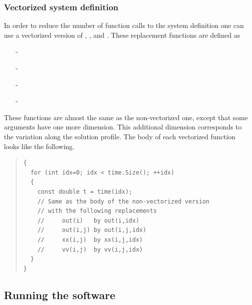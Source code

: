 \documentclass[10pt,a4paper]{ddedoc}
\begin{document}
\subsubsection{Vectorized system definition}\label{vecsysdef}

In order to reduce the number of function calls to the system definition one can 
use a vectorized version of , ,  and . These replacement functions are defined as
\begin{itemize}
  \item[-] 
  \item[-] 
  \item[-] 
  \item[-] 
\end{itemize}
These functions are almost the same as the non-vectorized one, except that some arguments have one more dimension. This additional dimension corresponds to the variation along the solution profile. The body of each vectorized function looks like the following.
{ \small \begin{quote} \begin{lstlisting}[frame=single]
{
  for (int idx=0; idx < time.Size(); ++idx)
  {
    const double t = time(idx);
    // Same as the body of the non-vectorized version
    // with the following replacements
    //     out(i)   by out(i,idx)
    //     out(i,j) by out(i,j,idx)
    //     xx(i,j)  by xx(i,j,idx)
    //     vv(i,j)  by vv(i,j,idx)
  }
}
\end{lstlisting} \end{quote} } \noindent

\subsection{Running the software}
\end{document}
